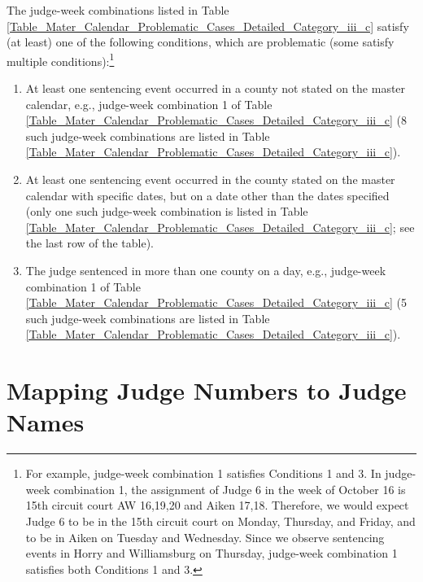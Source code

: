 \documentclass[11pt, oneside]{article}   	%
\theoremstyle{ModifiedStyle}
\begin{document}
			The judge-week combinations listed in Table \ref{Table_Mater_Calendar_Problematic_Cases_Detailed_Category_iii_c} satisfy (at least) one of the following conditions, which are problematic (some satisfy multiple conditions):\footnote{For example, judge-week combination 1 satisfies Conditions 1 and 3. In judge-week combination 1, the assignment of Judge 6 in the week of October 16 is 15th circuit court AW 16,19,20 and Aiken 17,18. Therefore, we would expect Judge 6 to be in the 15th circuit court on Monday, Thursday, and Friday, and to be in Aiken on Tuesday and Wednesday. Since we observe sentencing events in Horry and Williamsburg on Thursday, judge-week combination 1 satisfies both Conditions 1 and 3.}
			\begin{enumerate}
				\vspace{-3mm}
				\item At least one sentencing event occurred in a county not stated on the master calendar, e.g., judge-week combination 1 of Table \ref{Table_Mater_Calendar_Problematic_Cases_Detailed_Category_iii_c} (8 such judge-week combinations are listed in Table \ref{Table_Mater_Calendar_Problematic_Cases_Detailed_Category_iii_c}).
				\vspace{-2mm}
				\item At least one sentencing event occurred in the county stated on the master calendar with specific dates, but on a date other than the dates specified (only one such judge-week combination is listed in Table \ref{Table_Mater_Calendar_Problematic_Cases_Detailed_Category_iii_c}; see the last row of the table).
				\vspace{-2mm}
				\item The judge sentenced in more than one county on a day, e.g., judge-week combination 1 of Table \ref{Table_Mater_Calendar_Problematic_Cases_Detailed_Category_iii_c} (5 such judge-week combinations are listed in Table \ref{Table_Mater_Calendar_Problematic_Cases_Detailed_Category_iii_c}).
			\end{enumerate}
			\vspace{-3mm}

\section{Mapping Judge Numbers to Judge Names}
\label{Sec:Mapping_Judge_Numbers_To_Judge_Names}
\end{document}
